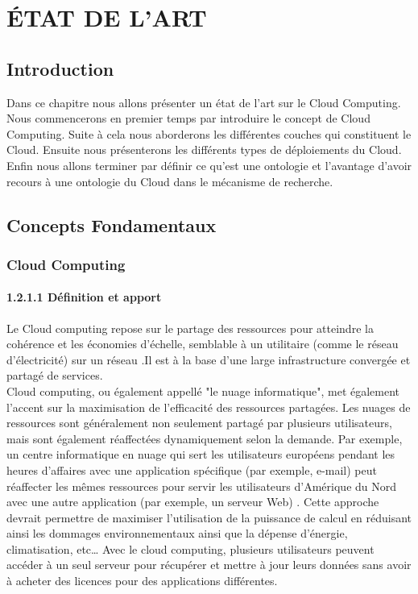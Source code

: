 \chapter{\'{E}TAT DE L’ART} \label{intro}
\section{Introduction}
    Dans ce chapitre nous allons présenter un état de l’art sur le Cloud Computing.
    Nous commencerons  en premier temps par introduire le concept de Cloud Computing.
    Suite à cela nous aborderons les différentes couches qui constituent le Cloud.
    Ensuite nous présenterons les différents types de déploiements du Cloud.
    Enfin nous allons terminer par définir ce qu’est une ontologie et l’avantage d’avoir recours à une ontologie du Cloud dans le mécanisme de recherche.

\section{Concepts Fondamentaux}
    \subsection{Cloud Computing}
        \subsubsection{1.2.1.1 Définition et apport}


                Le Cloud computing repose sur le partage des ressources pour atteindre la cohérence et les économies d'échelle, semblable à un utilitaire (comme le réseau d'électricité) sur un réseau .Il est à la base  d’une large infrastructure convergée et partagé de services.\\

                Cloud computing, ou également appellé "le nuage informatique", met également l'accent sur la maximisation de l'efficacité des ressources partagées. Les nuages de ressources sont généralement non seulement partagé par plusieurs utilisateurs, mais sont également réaffectées dynamiquement selon la demande. Par exemple, un centre informatique en nuage qui sert les utilisateurs européens pendant les heures d'affaires avec une application spécifique (par exemple, e-mail) peut réaffecter les mêmes ressources pour servir les utilisateurs d'Amérique du Nord avec une autre application (par exemple, un serveur Web) . Cette approche devrait permettre de maximiser l'utilisation de la puissance de calcul en réduisant ainsi les dommages environnementaux ainsi  que la dépense  d'énergie, climatisation, etc…  Avec le cloud computing, plusieurs utilisateurs peuvent accéder à un seul serveur pour récupérer et mettre à jour leurs données sans avoir à acheter des licences pour des applications différentes.\\

